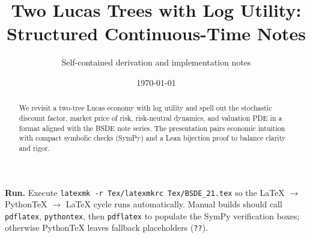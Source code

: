 ﻿\documentclass[11pt,letterpaper,oneside]{article}
\title{\vspace{-1.5em}Two Lucas Trees with Log Utility: Structured Continuous-Time Notes}
\author{\small Self-contained derivation and implementation notes}
\date{\small \today}
\numberwithin{equation}{section}
\newcommand{\1}{\mathbf{1}}
\begin{document}
\maketitle

\begin{abstract}
\noindent
We revisit a two-tree Lucas economy with log utility and spell out the stochastic discount factor, market price of risk, risk-neutral dynamics, and valuation PDE in a format aligned with the BSDE note series. The presentation pairs economic intuition with compact symbolic checks (SymPy) and a Lean bijection proof to balance clarity and rigor.
\end{abstract}

\tableofcontents
\begin{tcolorbox}[literaturestyle,title={Build note: PythonTeX pipeline}]
\textbf{Run.} Execute \texttt{latexmk -r Tex/latexmkrc Tex/BSDE\_21.tex} so the LaTeX $\to$ PythonTeX $\to$ LaTeX cycle runs automatically. Manual builds should call \texttt{pdflatex}, \texttt{pythontex}, then \texttt{pdflatex} to populate the SymPy verification boxes; otherwise PythonTeX leaves fallback placeholders (\texttt{??}).
\end{tcolorbox}


\newpage
\end{document}
